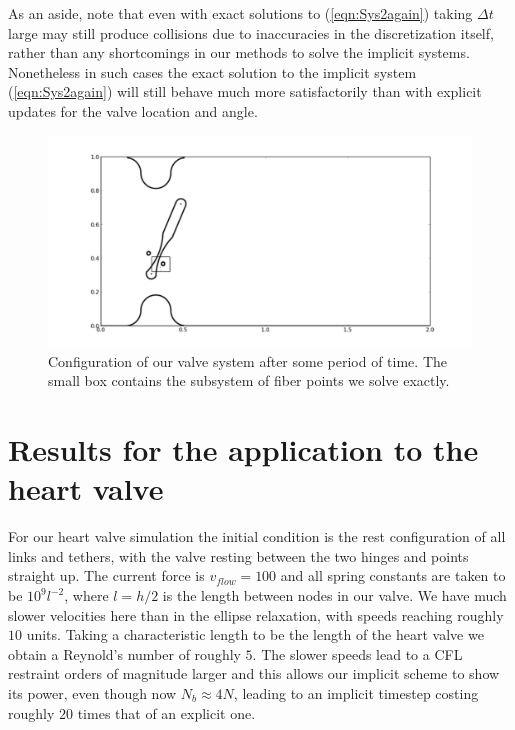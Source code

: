 \documentclass[preprint,12pt]{elsarticle}
\begin{document}
As an aside, note that even with exact solutions to (\ref{eqn:Sys2again}) taking $\Delta t$ large may still produce collisions due to inaccuracies in the discretization itself, rather than any shortcomings in our methods to solve the implicit systems. Nonetheless in such cases the exact solution to the implicit system (\ref{eqn:Sys2again}) will still behave much more satisfactorily than with explicit updates for the valve location and angle.

\begin{figure}[!b]
  \begin{center}
    \includegraphics[bb=.5in .25in 7.35in 3.75in,width=5.25in,clip]{Box.pdf}
  \end{center}

  \caption{\small Configuration of our valve system after some period of time. The small box contains the subsystem of fiber points we solve exactly.}
  \label{fig:Box}
\end{figure}


\section{Results for the application to the heart valve}
For our heart valve simulation the initial condition is the rest configuration of all links and tethers, with the valve resting between the two hinges and points straight up. The current force is $v_{flow}=100$ and all spring constants are taken to be $10^9l^{-2}$, where $l=h/2$ is the length between nodes in our valve. We have much slower velocities here than in the ellipse relaxation, with speeds reaching roughly $10$ units. Taking a characteristic length to be the length of the heart valve we obtain a Reynold's number of roughly $5$. The slower speeds lead to a CFL restraint orders of magnitude larger and this allows our implicit scheme to show its power, even though now $N_b \approx 4N$, leading to an implicit timestep costing roughly $20$ times that of an explicit one.
\end{document}
